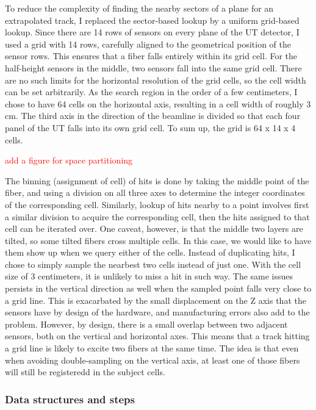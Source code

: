 \documentclass[12pt]{article}
\begin{document}
To reduce the complexity of finding the nearby sectors of a plane for an extrapolated track, I replaced the sector-based lookup by a uniform grid-based lookup. Since there are 14  rows of sensors on every plane of the UT detector, I used a grid with 14 rows, carefully aligned to the geometrical position of the sensor rows. This ensures that a fiber falls entirely within its grid cell. For the half-height sensors in the middle, two sensors fall into the same grid cell. There are no such limits for the horizontal resolution of the grid cells, so the cell width can be set arbitrarily. As the search region in the order of a few centimeters, I chose to have 64 cells on the horizontal axis, resulting in a cell width of roughly 3 cm. The third axis in the direction of the beamline is divided so that each four panel of the UT falls into its own grid cell. To sum up, the grid is 64 x 14 x 4 cells.

\textcolor{red}{add a figure for space partitioning}

The binning (assignment of cell) of hits is done by taking the middle point of the fiber, and using a division on all three axes to determine the integer coordinates of the corresponding cell.
Similarly, lookup of hits nearby to a point involves first a similar division to acquire the corresponding cell, then the hits assigned to that cell can be iterated over. One caveat, however, is that the middle two layers are tilted, so some tilted fibers cross multiple cells. In this case, we would like to have them show up when we query either of the cells. Instead of duplicating hits, I chose to simply sample the nearbest two cells instead of just one. With the cell size of 3 centimeters, it is unlikely to miss a hit in such way. The same issues persists in the vertical direction as well when the sampled point falls very close to a grid line. This is exacarbated by the small displacement on the Z axis that the sensors have by design of the hardware, and manufacturing errors also add to the problem. However, by design, there is a small overlap between two adjacent sensors, both on the vertical and horizontal axes. This means that a track hitting a grid line is likely to excite two fibers at the same time. The idea is that even when avoiding double-sampling on the vertical axis, at least one of those fibers will still be registeredd in the subject cells.


\subsubsection{Data structures and steps}
\end{document}
